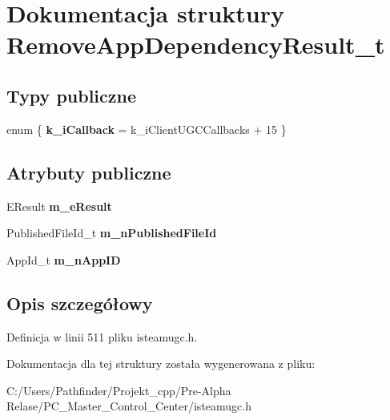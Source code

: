 \hypertarget{struct_remove_app_dependency_result__t}{}\section{Dokumentacja struktury Remove\+App\+Dependency\+Result\+\_\+t}
\label{struct_remove_app_dependency_result__t}
\subsection*{Typy publiczne}
\begin{DoxyCompactItemize}
\item 
\mbox{\label{struct_remove_app_dependency_result__t_a6d430c6bc097208e900f534d0b697cd9}} 
enum \{ {\bfseries k\+\_\+i\+Callback} = k\+\_\+i\+Client\+U\+G\+C\+Callbacks + 15
 \}
\end{DoxyCompactItemize}
\subsection*{Atrybuty publiczne}
\begin{DoxyCompactItemize}
\item 
\mbox{\label{struct_remove_app_dependency_result__t_a664e61f2512021b478f37e5c54d3f7c8}} 
E\+Result {\bfseries m\+\_\+e\+Result}
\item 
\mbox{\label{struct_remove_app_dependency_result__t_ad02eb8abdc81dd7413f689ac4861d82b}} 
Published\+File\+Id\+\_\+t {\bfseries m\+\_\+n\+Published\+File\+Id}
\item 
\mbox{\label{struct_remove_app_dependency_result__t_ab694a5c5f61e0c033e335b4c293ca1f5}} 
App\+Id\+\_\+t {\bfseries m\+\_\+n\+App\+ID}
\end{DoxyCompactItemize}


\subsection{Opis szczegółowy}


Definicja w linii 511 pliku isteamugc.\+h.



Dokumentacja dla tej struktury została wygenerowana z pliku\+:\begin{DoxyCompactItemize}
\item 
C\+:/\+Users/\+Pathfinder/\+Projekt\+\_\+cpp/\+Pre-\/\+Alpha Relase/\+P\+C\+\_\+\+Master\+\_\+\+Control\+\_\+\+Center/isteamugc.\+h\end{DoxyCompactItemize}
